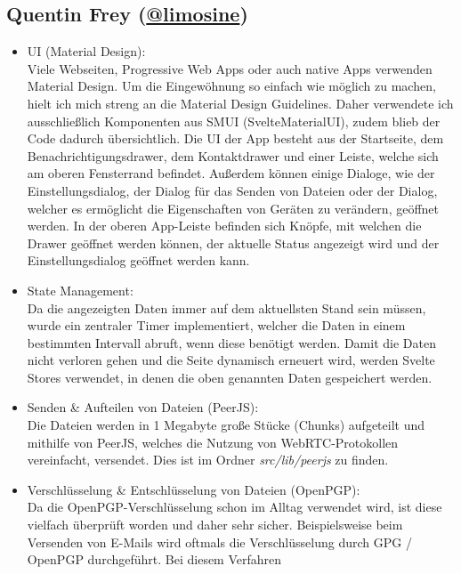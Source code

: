 \documentclass[a4paper]{article}
\begin{document}
\subsection{Quentin Frey (\href{https://github.com/limosine}{@limosine})}
\begin{itemize}
  \item UI (Material Design):\\
        Viele Webseiten, Progressive Web Apps oder auch native Apps verwenden Material Design.
        Um die Eingewöhnung so einfach wie möglich zu machen, hielt ich mich streng an
        die Material Design Guidelines. Daher verwendete ich ausschließlich Komponenten aus
        SMUI (SvelteMaterialUI), zudem blieb der Code dadurch übersichtlich. Die UI der App
        besteht aus der Startseite, dem Benachrichtigungsdrawer, dem Kontaktdrawer und einer
        Leiste, welche sich am oberen Fensterrand befindet. Außerdem können einige Dialoge,
        wie der Einstellungsdialog, der Dialog für das Senden von Dateien oder der Dialog,
        welcher es ermöglicht die Eigenschaften von Geräten zu verändern, geöffnet werden.
        In der oberen App-Leiste befinden sich Knöpfe, mit welchen die Drawer geöffnet werden
        können, der aktuelle Status angezeigt wird und der Einstellungsdialog geöffnet werden kann.
  \item State Management:\\
        Da die angezeigten Daten immer auf dem aktuellsten Stand sein müssen, wurde
        ein zentraler Timer implementiert, welcher die Daten in einem bestimmten Intervall
        abruft, wenn diese benötigt werden. Damit die Daten nicht verloren gehen und die
        Seite dynamisch erneuert wird, werden Svelte Stores verwendet, in denen die oben
        genannten Daten gespeichert werden.
  \item Senden \& Aufteilen von Dateien (PeerJS):\\
        Die Dateien werden in 1 Megabyte große Stücke
        (Chunks) aufgeteilt und mithilfe von PeerJS, welches die Nutzung von WebRTC-Protokollen
        vereinfacht, versendet. Dies ist im Ordner \textit{src/lib/peerjs} zu finden.
  \item Verschlüsselung \& Entschlüsselung von Dateien (OpenPGP):\\
        Da die OpenPGP-Verschlüsselung schon im Alltag verwendet wird, ist diese
        vielfach überprüft worden und daher sehr sicher. Beispielsweise beim Versenden von E-Mails
        wird oftmals die Verschlüsselung durch GPG / OpenPGP durchgeführt. Bei diesem Verfahren

\end{itemize}
\end{document}
